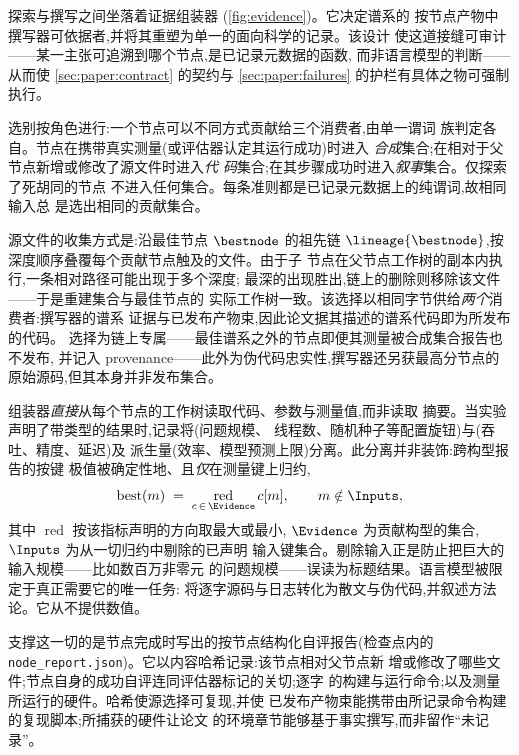 探索与撰写之间坐落着证据组装器 (\cref{fig:evidence})。它决定谱系的
按节点产物中撰写器可依据者,并将其重塑为单一的面向科学的记录。该设计
使这道接缝可审计——某一主张可追溯到哪个节点,是已记录元数据的函数,
而非语言模型的判断——从而使 \cref{sec:paper:contract} 的契约与
\cref{sec:paper:failures} 的护栏有具体之物可强制执行。

选别按角色进行:一个节点可以不同方式贡献给三个消费者,由单一谓词
族判定各自。节点在携带真实测量(或评估器认定其运行成功)时进入
\emph{合成}集合;在相对于父节点新增或修改了源文件时进入\emph{代
码}集合;在其步骤成功时进入\emph{叙事}集合。仅探索了死胡同的节点
不进入任何集合。每条准则都是已记录元数据上的纯谓词,故相同输入总
是选出相同的贡献集合。

源文件的收集方式是:沿最佳节点 $\bestnode$ 的祖先链
$\lineage{\bestnode}$,按深度顺序叠覆每个贡献节点触及的文件。由于子
节点在父节点工作树的副本内执行,一条相对路径可能出现于多个深度;
最深的出现胜出,链上的删除则移除该文件——于是重建集合与最佳节点的
实际工作树一致。该选择以相同字节供给\emph{两个}消费者:撰写器的谱系
证据与已发布产物束,因此论文据其描述的谱系代码即为所发布的代码。
选择为链上专属——最佳谱系之外的节点即便其测量被合成集合报告也不发布,
并记入 provenance——此外为伪代码忠实性,撰写器还另获最高分节点的
原始源码,但其本身并非发布集合。

组装器\emph{直接}从每个节点的工作树读取代码、参数与测量值,而非读取
摘要。当实验声明了带类型的结果时,记录将(问题规模、
线程数、随机种子等配置旋钮)与(吞吐、精度、延迟)及
派生量(效率、模型预测上限)分离。此分离并非装饰:跨构型报告的按键
极值被确定性地、且\emph{仅}在测量键上归约,
\begin{equation}\label{eq:reduction}
  \mathrm{best}(m)\;=\;\operatorname*{red}_{c\,\in\,\Evidence} c[m],
  \qquad m \notin \Inputs,
\end{equation}
其中 $\operatorname*{red}$ 按该指标声明的方向取最大或最小,
$\Evidence$ 为贡献构型的集合,$\Inputs$ 为从一切归约中剔除的已声明
输入键集合。剔除输入正是防止把巨大的输入规模——比如数百万非零元
的问题规模——误读为标题结果。语言模型被限定于真正需要它的唯一任务:
将逐字源码与日志转化为散文与伪代码,并叙述方法论。它从不提供数值。

支撑这一切的是节点完成时写出的按节点结构化自评报告(检查点内的
\texttt{node\_report.json})。它以内容哈希记录:该节点相对父节点新
增或修改了哪些文件;节点自身的成功自评连同评估器标记的关切;逐字
的构建与运行命令;以及测量所运行的硬件。哈希使源选择可复现,并使
已发布产物束能携带由所记录命令构建的复现脚本;所捕获的硬件让论文
的环境章节能够基于事实撰写,而非留作“未记录”。

